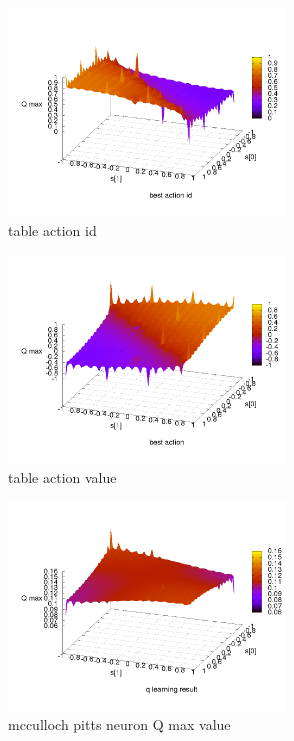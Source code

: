 \documentclass[10pt,a5paper]{article}
\begin{document}
\begin{figure}[!ht]
\centering
\includegraphics[width=2.9in]{q_learning_test/experiment_01/table/q_action_id.png}
\caption{table action id}
\label{table action id}
\end{figure}

\begin{figure}[!ht]
\centering
\includegraphics[width=2.9in]{q_learning_test/experiment_01/table/q_action.png}
\caption{table action value}
\label{table action value}
\end{figure}

\begin{figure}[!ht]
\centering
\includegraphics[width=2.9in]{q_learning_test/experiment_01/mcculloch_pitts_neuron/q_map.png}
\caption{mcculloch pitts neuron Q max value}
\label{mcculloch pitts neuron Q max value}
\end{figure}
\end{document}
